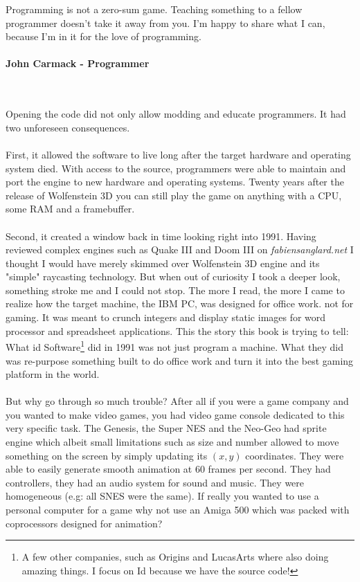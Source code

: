  \begin{fancyquotes}
   Programming is not a zero-sum game. Teaching something to a fellow programmer doesn't take it away from you. I'm happy to share what I can, because I'm in it for the love of programming.\\
   \\
\textbf{John Carmack - Programmer}
 \end{fancyquotes}\\
\\
Opening the code did not only allow modding and educate programmers. It had two unforeseen consequences.\\
\\
First, it allowed the software to live long after the target hardware and operating system died. With access to the source, programmers were able to maintain and port the engine to new hardware and operating systems. Twenty years after the release of Wolfenstein 3D you can still play the game on anything with a CPU, some RAM and a framebuffer. \\
\\
Second, it created a window back in time looking right into 1991. Having reviewed complex engines such as Quake III and Doom III on \emph{fabiensanglard.net} I thought I would have merely skimmed over Wolfenstein 3D engine and its "simple" raycasting technology. But when out of curiosity I took a deeper look, something stroke me and I could not stop. The more I read, the more I came to realize how the target machine, the IBM PC, was designed for office work. not for gaming. It was meant to crunch integers and display static images for word processor and spreadsheet applications. This the story this book is trying to tell: What id Software\footnote{A few other companies, such as Origins and LucasArts where also doing amazing things. I focus on Id because we have the source code!} did in 1991 was not just program a machine. What they did was re-purpose something built to do office work and turn it into the best gaming platform in the world.\\
\\
But why go through so much trouble? After all if you were a game company and you wanted to make video games, you had video game console dedicated to this very specific task. The Genesis, the Super NES and the Neo-Geo had sprite engine which albeit small limitations such as size and number allowed to move something on the screen by simply updating its $(x,y)$ coordinates. They were able to easily generate smooth animation at 60 frames per second. They had controllers, they had an audio system for sound and music. They were homogeneous (e.g: all SNES were the same). If really you wanted to use a personal computer for a game why not use an Amiga 500 which was packed with coprocessors designed for animation?\\

